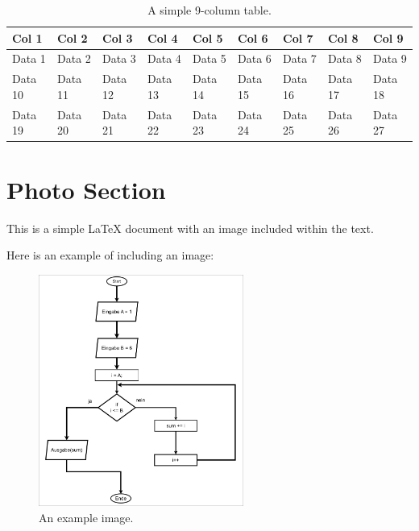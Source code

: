 \documentclass{article}  %
\begin{document}
\begin{table}[h!]
\centering
\begin{tabularx}{\textwidth}{|X|X|X|X|X|X|X|X|X|}
\hline
\textbf{Col 1} & \textbf{Col 2} & \textbf{Col 3} & \textbf{Col 4} & \textbf{Col 5} & \textbf{Col 6} & \textbf{Col 7} & \textbf{Col 8} & \textbf{Col 9} \\
\hline
Data 1 & Data 2 & Data 3 & Data 4 & Data 5 & Data 6 & Data 7 & Data 8 & Data 9 \\
Data 10 & Data 11 & Data 12 & Data 13 & Data 14 & Data 15 & Data 16 & Data 17 & Data 18 \\
Data 19 & Data 20 & Data 21 & Data 22 & Data 23 & Data 24 & Data 25 & Data 26 & Data 27 \\
\hline
\end{tabularx}
\caption{A simple 9-column table.}
\end{table}


\section{Photo Section}
This is a simple LaTeX document with an image included within the text.

Here is an example of including an image:

\begin{figure}
    \centering
    \includegraphics[width=0.60\textwidth]{example-image.png}
    \caption{An example image.}
    \label{fig:example}
\end{figure}
\end{document}
